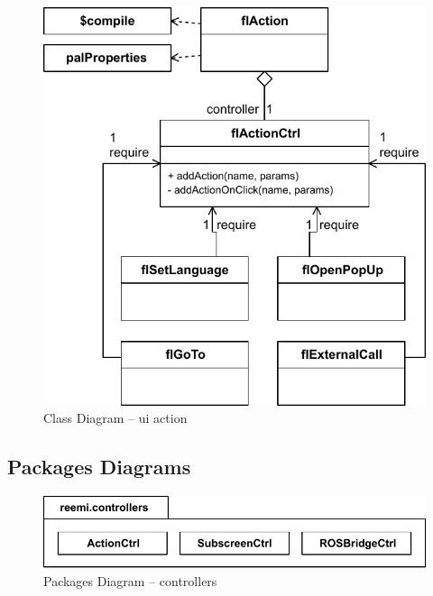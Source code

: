 \begin{figure}[htb]
    \centering
    \includegraphics{figures/design-class-action.pdf}
    \caption{Class Diagram -- ui action}
    \label{fig:class-action}
\end{figure}


\FloatBarrier
\subsection{Packages Diagrams}

\begin{figure}[htb]
    \centering
    \includegraphics{figures/design-package-controllers.pdf}
    \caption{Packages Diagram -- controllers}
    \label{fig:pkg-controllers}
\end{figure}


